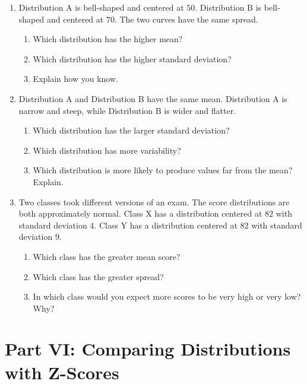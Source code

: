 \documentclass[11pt]{article}
\newcommand{\answerline}{\vspace{1.2cm}}
\newcommand{\biganswer}{\vspace{2cm}}
\begin{document}
\begin{enumerate}[leftmargin=*, label=\textbf{\arabic*.}, start=16]

\item Distribution A is bell-shaped and centered at $50$. Distribution B is bell-shaped and centered at $70$. The two curves have the same spread.
\begin{enumerate}[label=(\alph*)]
    \item Which distribution has the higher mean? \answerline
    \item Which distribution has the higher standard deviation? \answerline
    \item Explain how you know. \biganswer
\end{enumerate}

\item Distribution A and Distribution B have the same mean. Distribution A is narrow and steep, while Distribution B is wider and flatter.
\begin{enumerate}[label=(\alph*)]
    \item Which distribution has the larger standard deviation? \answerline
    \item Which distribution has more variability? \answerline
    \item Which distribution is more likely to produce values far from the mean? Explain. \biganswer
\end{enumerate}

\item Two classes took different versions of an exam. The score distributions are both approximately normal. Class X has a distribution centered at $82$ with standard deviation $4$. Class Y has a distribution centered at $82$ with standard deviation $9$.
\begin{enumerate}[label=(\alph*)]
    \item Which class has the greater mean score? \answerline
    \item Which class has the greater spread? \answerline
    \item In which class would you expect more scores to be very high or very low? Why? \biganswer
\end{enumerate}

\end{enumerate}

\section{Part VI: Comparing Distributions with Z-Scores}
\end{document}
